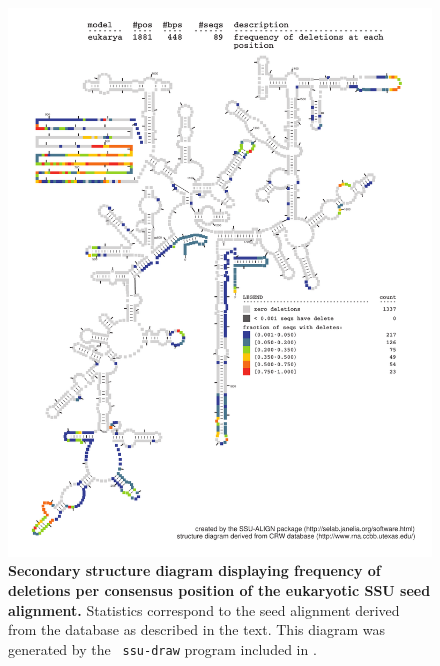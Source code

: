 \begin{figure}
\begin{center}
\includegraphics[width=5.7in]{Figures/eukarya-0p1-dall}
\end{center}
\caption[Secondary structure diagram displaying frequency of deletions
  per consensus position of the eukaryotic SSU seed
  alignment]{\textbf{Secondary structure diagram displaying frequency 
  of deletions per consensus position of the eukaryotic SSU seed
  alignment.} Statistics correspond to the  seed
  alignment derived from the  database \cite{CannoneGutell02}
  as described in the text. This diagram was generated by the {\tt
  ssu-draw} program included in .}
\label{fig:eukdel}
\end{figure}

